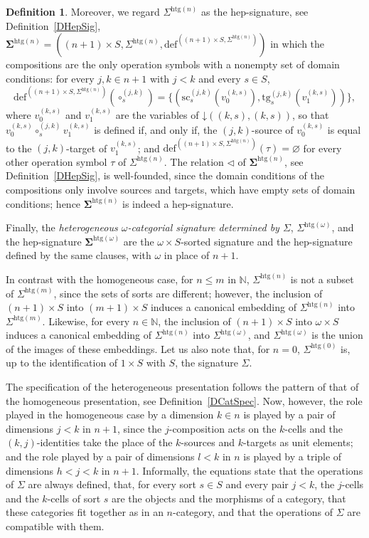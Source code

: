 \documentclass[a4paper, reqno]{amsbook}
\newcommand{\vs}[1]{\mathbin{\downarrow}#1}
\newcommand{\sig}[1]{\mathbf{#1}}             %
\newcommand{\htg}{\mathrm{htg}}                %
\newcommand{\src}{\mathrm{sc}}
\newcommand{\tgt}{\mathrm{tg}}
\theoremstyle{plain}
\theoremstyle{definition}
\newtheorem{definition}[theorem]{Definition}
\begin{document}
\begin{definition}
Moreover, we regard $\Sigma^{\htg(n)}$ as the hep-signature, see Definition~\ref{DHepSig}, $\sig{\Sigma}^{\htg(n)}=((n+1)\times S,\Sigma^{\htg(n)},\mathrm{def}^{((n+1)\times S,\Sigma^{\htg(n)})})$ in which the compositions are the only operation symbols with a nonempty set of domain conditions: for every $j,k\in n+1$ with $j<k$ and every $s\in S$,
$$
\mathrm{def}^{((n+1)\times S,\Sigma^{\htg(n)})}(\circ^{(j,k)}_{s})=\{(\src^{(j,k)}_{s}(v^{(k,s)}_{0}),\tgt^{(j,k)}_{s}(v^{(k,s)}_{1}))\},
$$
where $v^{(k,s)}_{0}$ and $v^{(k,s)}_{1}$ are the variables of $\vs{((k,s),(k,s))}$, so that $v^{(k,s)}_{0}\circ^{(j,k)}_{s}v^{(k,s)}_{1}$ is defined if, and only if, the $(j,k)$-source of $v^{(k,s)}_{0}$ is equal to the $(j,k)$-target of $v^{(k,s)}_{1}$; and $\mathrm{def}^{((n+1)\times S,\Sigma^{\htg(n)})}(\tau)=\varnothing$ for every other operation symbol $\tau$ of $\Sigma^{\htg(n)}$.
The relation $\lhd$ of $\sig{\Sigma}^{\htg(n)}$, see Definition~\ref{DHepSig}, is well-founded, since the domain conditions of the compositions only involve sources and targets, which have empty sets of domain conditions; hence $\sig{\Sigma}^{\htg(n)}$ is indeed a hep-signature.

Finally, the \emph{heterogeneous $\omega$-categorial signature determined by $\Sigma$}, $\Sigma^{\htg(\omega)}$, and the hep-signature $\sig{\Sigma}^{\htg(\omega)}$ are the $\omega\times S$-sorted signature and the hep-signature defined by the same clauses, with $\omega$ in place of $n+1$.
\end{definition}

In contrast with the homogeneous case, for $n\leq m$ in $\mathbb{N}$, $\Sigma^{\htg(n)}$ is not a subset of $\Sigma^{\htg(m)}$, since the sets of sorts are different; however, the inclusion of $(n+1)\times S$ into $(m+1)\times S$ induces a canonical embedding of $\Sigma^{\htg(n)}$ into $\Sigma^{\htg(m)}$.
Likewise, for every $n\in\mathbb{N}$, the inclusion of $(n+1)\times S$ into $\omega\times S$ induces a canonical embedding of $\Sigma^{\htg(n)}$ into $\Sigma^{\htg(\omega)}$, and $\Sigma^{\htg(\omega)}$ is the union of the images of these embeddings.
Let us also note that, for $n=0$, $\Sigma^{\htg(0)}$ is, up to the identification of $1\times S$ with $S$, the signature $\Sigma$.

The specification of the heterogeneous presentation follows the pattern of that of the homogeneous presentation, see Definition~\ref{DCatSpec}.
Now, however, the role played in the homogeneous case by a dimension $k\in n$ is played by a pair of dimensions $j<k$ in $n+1$, since the $j$-composition acts on the $k$-cells and the $(k,j)$-identities take the place of the $k$-sources and $k$-targets as unit elements; and the role played by a pair of dimensions $l<k$ in $n$ is played by a triple of dimensions $h<j<k$ in $n+1$.
Informally, the equations state that the operations of $\Sigma$ are always defined, that, for every sort $s\in S$ and every pair $j<k$, the $j$-cells and the $k$-cells of sort $s$ are the objects and the morphisms of a category, that these categories fit together as in an $n$-category, and that the operations of $\Sigma$ are compatible with them.
\end{document}
